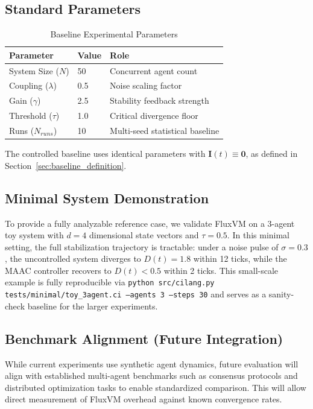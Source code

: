\documentclass{article}
\begin{document}
\subsection{Standard Parameters}
\begin{table}[h]
\centering
\begin{tabular}{|l|l|l|}
\hline
\textbf{Parameter} & \textbf{Value} & \textbf{Role} \\ \hline
System Size ($N$) & 50 & Concurrent agent count \\ \hline
Coupling ($\lambda$) & 0.5 & Noise scaling factor \\ \hline
Gain ($\gamma$) & 2.5 & Stability feedback strength \\ \hline
Threshold ($\tau$) & 1.0 & Critical divergence floor \\ \hline
Runs ($N_{runs}$) & 10 & Multi-seed statistical baseline \\ \hline
\end{tabular}
\caption{Baseline Experimental Parameters}
\end{table}

The controlled baseline uses identical parameters with $\mathbf{I}(t) \equiv \mathbf{0}$, as defined in Section~\ref{sec:baseline_definition}.

\subsection{Minimal System Demonstration}
To provide a fully analyzable reference case, we validate FluxVM on a 3-agent toy system with $d=4$ dimensional state vectors and $\tau=0.5$. In this minimal setting, the full stabilization trajectory is tractable: under a noise pulse of $\sigma=0.3$, the uncontrolled system diverges to $D(t)=1.8$ within 12 ticks, while the MAAC controller recovers to $D(t)<0.5$ within 2 ticks. This small-scale example is fully reproducible via \texttt{python src/cilang.py tests/minimal/toy\_3agent.ci --agents 3 --steps 30} and serves as a sanity-check baseline for the larger experiments.

\subsection{Benchmark Alignment (Future Integration)}
While current experiments use synthetic agent dynamics, future evaluation will align with established multi-agent benchmarks such as consensus protocols \cite{olfati2007consensus} and distributed optimization tasks \cite{mesbahi2010graph} to enable standardized comparison. This will allow direct measurement of FluxVM overhead against known convergence rates.
\end{document}
